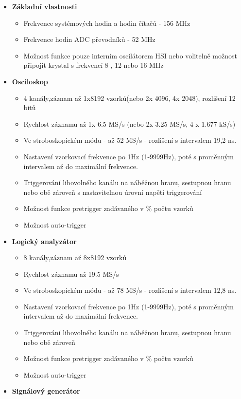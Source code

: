 \begin{itemize}
	\item \textbf{Základní vlastnosti}
	\begin{itemize}
		\item Frekvence systémových hodin a hodin čítačů - 156 MHz
		\item Frekvence hodin ADC převodníků - 52 MHz
		\item Možnost funkce pouze interním oscilátorem HSI nebo volitelně možnost připojit krystal s frekvencí 8 , 12 nebo 16 MHz
	\end{itemize}
	\item \textbf{Osciloskop}
	\begin{itemize}
		\item 4 kanály,záznam až 1x8192 vzorků(nebo 2x 4096, 4x 2048), rozlišení 12 bitů
		\item Rychlost záznamu až 1x 6.5 MS/s (nebo  2x 3.25 MS/s, 4 x 1.677 kS/s)
		\item Ve stroboskopickém módu - až  52 MS/s - rozlišení s intervalem 19,2 ns.
		\item Nastavení vzorkovací frekvence po 1Hz (1-9999Hz), poté s proměnným intervalem až do maximální frekvence.
		\item Triggerování libovolného kanálu na náběžnou hranu, sestupnou hranu nebo obě zároveň s nastavitelnou úrovní napětí triggerování
		\item Možnost funkce pretrigger zadávaného v \% počtu vzorků
		\item Možnost auto-trigger
	\end{itemize}
	\item \textbf{Logický analyzátor}
	\begin{itemize}
		\item 8 kanály,záznam až 8x8192 vzorků
		\item Rychlost záznamu až 19.5 MS/s
		\item Ve stroboskopickém módu - až  78 MS/s - rozlišení s intervalem 12,8 ns.
		\item Nastavení vzorkovací frekvence po 1Hz (1-9999Hz), poté s proměnným intervalem až do maximální frekvence.
		\item Triggerování libovolného kanálu na náběžnou hranu, sestupnou hranu nebo obě zároveň
		\item Možnost funkce pretrigger zadávaného v \% počtu vzorků
		\item Možnost auto-trigger 
	\end{itemize}
	\item \textbf{Signálový generátor}

\end{itemize}
